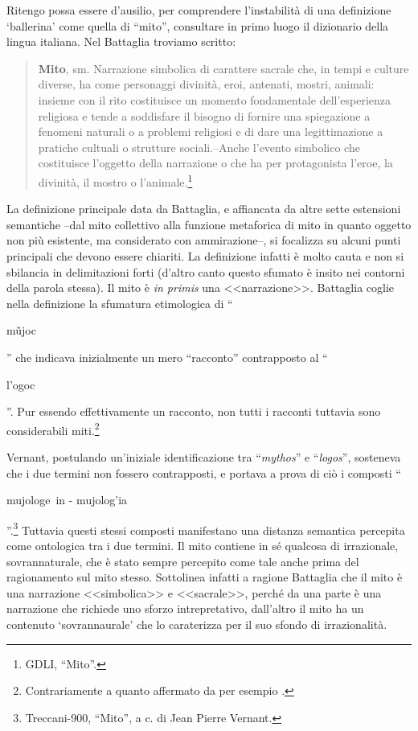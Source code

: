\documentclass[12pt,a4paper,openright, oneside]{book}
\begin{document}
Ritengo possa essere d'ausilio, per comprendere l'instabilità di una definizione `ballerina' come quella di ``mito'', consultare in primo luogo il dizionario della lingua italiana. Nel Battaglia troviamo scritto:
\begin{quote}\begin{singlespace}
\footnotesize{ \textbf{Mito}, sm. Narrazione simbolica di carattere sacrale che, in tempi e culture diverse, ha come personaggi divinità, eroi, antenati, mostri, animali: insieme con il rito costituisce un momento fondamentale dell'esperienza religiosa e tende a soddisfare il bisogno di fornire una spiegazione a fenomeni naturali o a problemi religiosi e di dare una legittimazione a pratiche cultuali o strutture sociali.--Anche l'evento simbolico che costituisce l'oggetto della narrazione o che ha per protagonista l'eroe, la divinità, il mostro o l'animale.\footnote{GDLI, ``Mito''.}}
\end{singlespace}\end{quote}

La definizione principale data da Battaglia, e affiancata da altre sette estensioni semantiche --dal mito collettivo alla funzione metaforica di mito in quanto oggetto non più esistente, ma considerato con ammirazione--, si focalizza su alcuni punti principali che devono essere chiariti. La definizione infatti è molto cauta e non si sbilancia in delimitazioni forti (d'altro canto questo sfumato è insito nei contorni della parola stessa). Il mito è \textit{in primis} una <<narrazione>>. Battaglia coglie nella definizione la sfumatura etimologica di ``\begin{otherlanguage}{greek} m\~ujoc\end{otherlanguage}'' che indicava inizialmente un mero ``racconto''  contrapposto al ``\begin{otherlanguage}{greek}l'ogoc \end{otherlanguage}''. Pur essendo effettivamente un racconto, non tutti i racconti tuttavia sono considerabili miti.\footnote{Contrariamente a quanto affermato da per esempio \cite{Wellek}.}

Vernant, postulando un'iniziale identificazione tra ``\textit{mythos}'' e ``\textit{logos}'', sosteneva che i due termini non fossero contrapposti, e portava a prova di ciò i composti ``\begin{otherlanguage}{greek}mujologe~in - mujolog'ia\end{otherlanguage}''.\footnote{Treccani-900, ``Mito'', a c. di Jean Pierre Vernant.} Tuttavia questi stessi composti manifestano una distanza semantica percepita come ontologica tra i due termini. Il mito contiene in sé qualcosa di irrazionale, sovrannaturale, che è stato sempre percepito come tale anche prima del ragionamento sul mito stesso.  Sottolinea infatti a ragione Battaglia che il mito è una narrazione <<simbolica>> e <<sacrale>>, perché da una parte è una narrazione che richiede uno sforzo intrepretativo, dall'altro il mito ha un contenuto `sovrannaurale' che lo caraterizza per il suo sfondo di irrazionalità.
\end{document}
